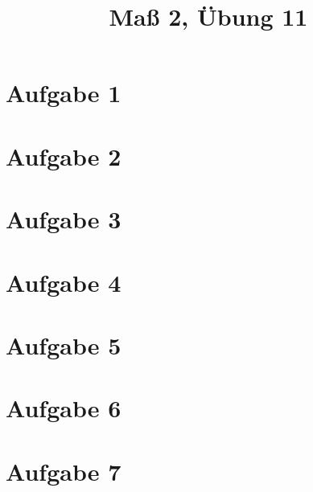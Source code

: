 \documentclass[]{article}
\author{}
\title{Maß 2, Übung 11}
\begin{document}
    \begin{titlepage}
        \maketitle
    \end{titlepage}
    \section*{Aufgabe 1}
    
    \section*{Aufgabe 2}
    
    \section*{Aufgabe 3}
    
    \section*{Aufgabe 4}
    
    \section*{Aufgabe 5}
    
    \section*{Aufgabe 6}
    
    \section*{Aufgabe 7}
    

%    
%    
\end{document}
